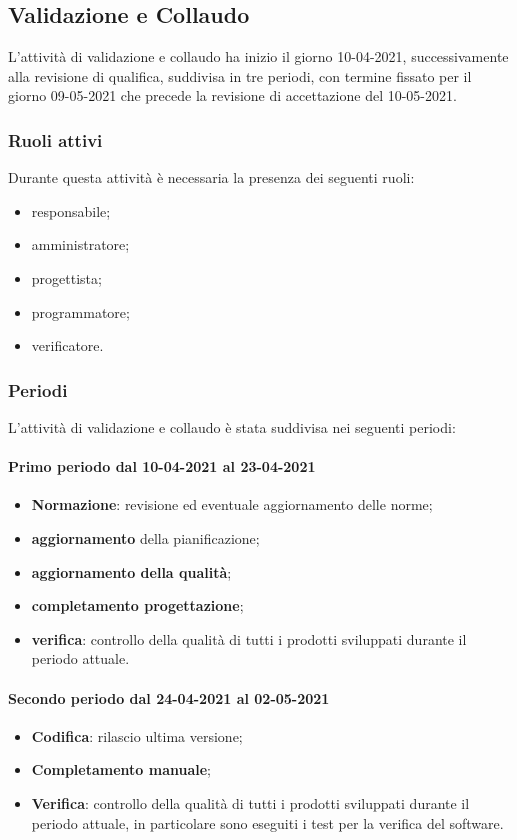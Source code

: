 \subsection{Validazione e Collaudo} 
L'attività di validazione e collaudo ha inizio il giorno 10-04-2021, successivamente alla revisione di 
qualifica, suddivisa in tre periodi, con termine fissato per il giorno 09-05-2021 che precede la revisione di accettazione del 10-05-2021. 

\subsubsection{Ruoli attivi} 
Durante questa attività è necessaria la presenza dei seguenti ruoli: 
\begin{itemize} 
	\item responsabile; 
	\item amministratore; 
	\item progettista; 
	\item programmatore; 
	\item verificatore.
\end{itemize} 

\subsubsection{Periodi} 
L'attività di validazione e collaudo è stata suddivisa nei seguenti periodi: 
\paragraph{Primo periodo dal 10-04-2021 al 23-04-2021} 
\begin{itemize} 
	\item \textbf{Normazione}: revisione ed eventuale aggiornamento delle norme; 
	\item \textbf{aggiornamento} della pianificazione; 
	\item \textbf{aggiornamento della qualità}; 
	\item \textbf{completamento progettazione}; 
	\item \textbf{verifica}: controllo della qualità di tutti i prodotti sviluppati durante il periodo attuale. 
\end{itemize} 

\paragraph{Secondo periodo dal 24-04-2021 al 02-05-2021} 
\begin{itemize} 
	\item \textbf{Codifica}: rilascio ultima versione; 
	\item \textbf{Completamento manuale}; 
	\item \textbf{Verifica}: controllo della qualità di tutti i prodotti sviluppati durante il periodo attuale, in 
	particolare sono eseguiti i test per la verifica del software. 
\end{itemize} 

